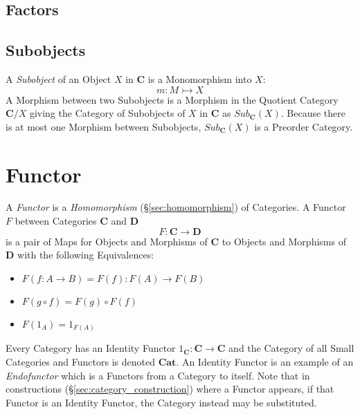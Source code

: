 \subsection{Factors}\label{sec:morphism_factor}

\subsection{Subobjects}\label{sec:category_subobjects}

A \emph{Subobject} of an Object $X$ in $\mathbf{C}$ is a Monomorphism
into $X$:
\[
    m : M \rightarrowtail X
\]
A Morphism between two Subobjects is a Morphism in the Quotient
Category $\mathbf{C}/X$ giving the Category of Subobjects of $X$ in
$\mathbf{C}$ as $Sub_{\mathbf{C}}(X)$. Because there is at most one
Morphism between Subobjects, $Sub_{\mathbf{C}}(X)$ is a Preorder
Category.



\section{Functor}\label{sec:functor}

A \emph{Functor} is a \emph{Homomorphism}
(\S\ref{sec:homomorphism}) of Categories. A Functor $F$ between
Categories $\mathbf{C}$ and $\mathbf{D}$
\[
    F : \mathbf{C} \rightarrow \mathbf{D}
\]
is a pair of Maps for Objects and Morphisms of $\mathbf{C}$ to Objects
and Morphisms of $\mathbf{D}$ with the following Equivalences:
\begin{itemize}
\item $F(f : A \rightarrow B) = F(f) : F(A) \rightarrow F(B)$
\item $F(g \circ f) = F(g) \circ F(f)$
\item $F(1_A) = 1_{F(A)}$
\end{itemize}
Every Category has an Identity Functor $1_{\mathbf{C}} : \mathbf{C}
\rightarrow \mathbf{C}$ and the Category of all Small Categories and
Functors is denoted $\mathbf{Cat}$. An Identity Functor is an example
of an \emph{Endofunctor} which is a Functors from a Category to
itself. Note that in constructions (\S\ref{sec:category_construction})
where a Functor appears, if that Functor is an Identity Functor, the
Category instead may be substituted.

